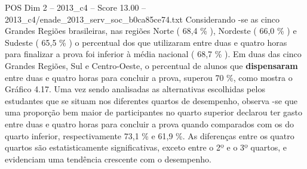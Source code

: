 \begin{textsample}{POS Dim 2 – 2013\_c4 – Score 13.00 – 2013\_c4/enade\_2013\_serv\_soc\_b0ca85ce74.txt}
Considerando -se as cinco Grandes Regiões brasileiras, nas regiões Norte ( 68,4 \% ), Nordeste ( 66,0 \% ) e Sudeste ( 65,5 \% ) o percentual dos que utilizaram entre duas e quatro horas para finalizar a prova foi inferior à média nacional ( 68,7 \% ).
Em duas das cinco Grandes Regiões, Sul e Centro-Oeste, o percentual de alunos que \textbf{dispensaram} entre duas e quatro horas para concluir a prova, superou 70 \%, como mostra o Gráfico 4.17.
Uma vez sendo analisadas as alternativas escolhidas pelos estudantes que se situam nos diferentes quartos de desempenho, observa -se que uma proporção bem maior de participantes no quarto superior declarou ter gasto entre duas e quatro horas para concluir a prova quando comparados com os do quarto inferior, respectivamente 73,1 \% e 61,9 \%.
As diferenças entre os quatro quartos são estatisticamente significativas, exceto entre o 2º e o 3º quartos, e evidenciam uma tendência crescente com o desempenho.

\end{textsample}
